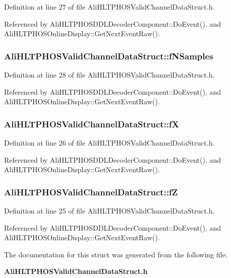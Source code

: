 Definition at line 27 of file Ali\-HLTPHOSValid\-Channel\-Data\-Struct.h.

Referenced by Ali\-HLTPHOSDDLDecoder\-Component::Do\-Event(), and Ali\-HLTPHOSOnline\-Display::Get\-Next\-Event\-Raw().
\subsubsection{ {\bf Ali\-HLTPHOSValid\-Channel\-Data\-Struct::f\-NSamples}}\label{structAliHLTPHOSValidChannelDataStruct_o3}




Definition at line 28 of file Ali\-HLTPHOSValid\-Channel\-Data\-Struct.h.

Referenced by Ali\-HLTPHOSDDLDecoder\-Component::Do\-Event(), and Ali\-HLTPHOSOnline\-Display::Get\-Next\-Event\-Raw().
\subsubsection{ {\bf Ali\-HLTPHOSValid\-Channel\-Data\-Struct::f\-X}}\label{structAliHLTPHOSValidChannelDataStruct_o1}




Definition at line 26 of file Ali\-HLTPHOSValid\-Channel\-Data\-Struct.h.

Referenced by Ali\-HLTPHOSDDLDecoder\-Component::Do\-Event(), and Ali\-HLTPHOSOnline\-Display::Get\-Next\-Event\-Raw().
\subsubsection{ {\bf Ali\-HLTPHOSValid\-Channel\-Data\-Struct::f\-Z}}\label{structAliHLTPHOSValidChannelDataStruct_o0}




Definition at line 25 of file Ali\-HLTPHOSValid\-Channel\-Data\-Struct.h.

Referenced by Ali\-HLTPHOSDDLDecoder\-Component::Do\-Event(), and Ali\-HLTPHOSOnline\-Display::Get\-Next\-Event\-Raw().

The documentation for this struct was generated from the following file:\begin{CompactItemize}
\item 
{\bf Ali\-HLTPHOSValid\-Channel\-Data\-Struct.h}\end{CompactItemize}
